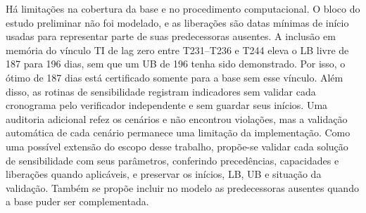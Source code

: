 Há limitações na cobertura da base e no procedimento computacional. O
bloco do estudo preliminar não foi modelado, e as liberações são datas
mínimas de início usadas para representar parte de suas predecessoras
ausentes. A inclusão em memória do vínculo TI de lag zero entre T231--T236
e T244 eleva o LB livre de 187 para 196 dias, sem que um UB de 196 tenha
sido demonstrado. Por isso, o ótimo de 187 dias está certificado somente
para a base sem esse vínculo. Além disso, as rotinas de sensibilidade
registram indicadores sem validar cada cronograma pelo verificador
independente e sem guardar seus inícios. Uma auditoria adicional refez os
cenários e não encontrou violações, mas a validação automática de cada
cenário permanece uma limitação da implementação. Como uma possível extensão do escopo desse trabalho,
propõe-se validar cada solução de sensibilidade com seus parâmetros,
conferindo precedências, capacidades e liberações quando aplicáveis, e
preservar os inícios, LB, UB e situação da validação. Também se propõe
incluir no modelo as predecessoras ausentes quando a base puder ser
complementada.
